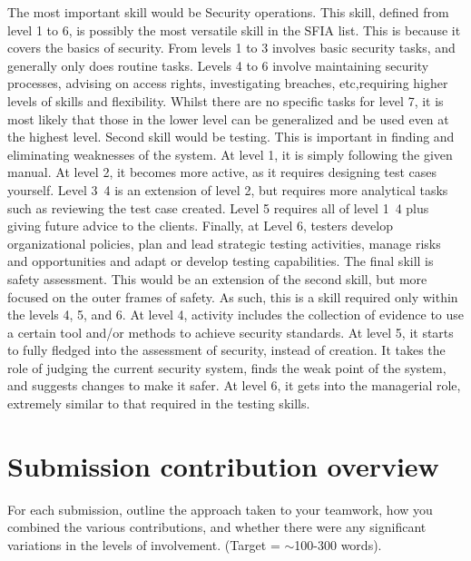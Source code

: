 \documentclass[a4paper, 11pt]{report}
\begin{document}
The most important skill would be Security operations. This skill, defined from level 1 to 6, is possibly the most versatile skill in the SFIA list. This is because it covers the basics of security. From levels 1 to 3 involves basic security tasks, and generally only does routine tasks. Levels 4 to 6 involve maintaining security processes, advising on access rights, investigating breaches, etc,requiring higher levels of skills and flexibility. Whilst there are no specific tasks for level 7, it is most likely that those in the lower level can be generalized and be used even at the highest level.\cite{SFIA_cybersecurity}
Second skill would be testing. This is important in finding and eliminating weaknesses of the system.
At level 1, it is simply following the given manual. At level 2, it becomes more active, as it requires designing test cases yourself. Level 3~4 is an extension of level 2, but requires more analytical tasks such as reviewing the test case created. Level 5 requires all of level 1~4 plus giving future advice to the clients. Finally, at Level 6, testers develop organizational policies, plan and lead strategic testing activities, manage risks and opportunities and adapt or develop testing capabilities.\cite{Testing}
The final skill is safety assessment. This would be an extension of the second skill, but more focused on the outer frames of safety. As such, this is a skill required only within the levels 4, 5, and 6. At level 4, activity includes the collection of evidence to use a certain tool and/or methods to achieve security standards. At level 5, it starts to fully fledged into the assessment of security, instead of creation. It takes the role of judging the current security system, finds the weak point of the system, and suggests changes to make it safer.
At level 6, it gets into the managerial role, extremely similar to that required in the testing skills.\cite{Safety_assessment}








\newpage
\section{Submission contribution overview}

For each submission, outline the approach taken to your teamwork, how you combined the various contributions, and whether there were any significant variations in the levels of involvement. (Target = $\sim$100-300 words).
\end{document}

